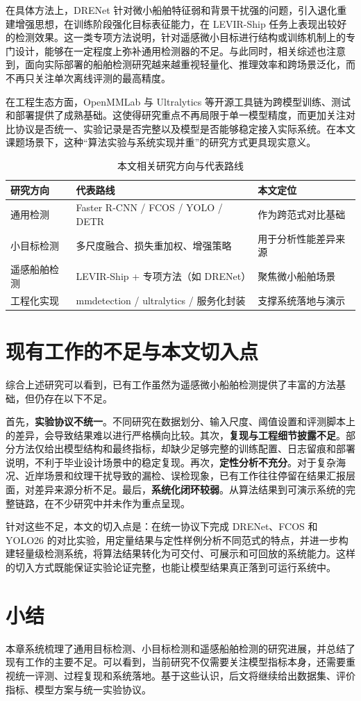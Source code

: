 在具体方法上，DRENet 针对微小船舶特征弱和背景干扰强的问题，引入退化重建增强思想，在训练阶段强化目标表征能力，在 LEVIR-Ship 任务上表现出较好的检测效果\cite{chen2022_tinyship_drenet}。这一类专项方法说明，针对遥感微小目标进行结构或训练机制上的专门设计，能够在一定程度上弥补通用检测器的不足。与此同时，相关综述也注意到，面向实际部署的船舶检测研究越来越重视轻量化、推理效率和跨场景泛化，而不再只关注单次离线评测的最高精度\cite{zhao2024_shipsurvey}。

在工程生态方面，OpenMMLab 与 Ultralytics 等开源工具链为跨模型训练、测试和部署提供了成熟基础\cite{mmdet2018_openmmlab,ultralytics2024_docs}。这使得研究重点不再局限于单一模型精度，而更加关注对比协议是否统一、实验记录是否完整以及模型是否能够稳定接入实际系统。在本文课题场景下，这种“算法实验与系统实现并重”的研究方式更具现实意义。

\begin{table}[htbp]
  \centering
  \caption{本文相关研究方向与代表路线}
  \label{tab:ch2_research_map}
  \begin{tabular}{lll}
    \toprule
    研究方向 & 代表路线 & 本文定位 \\
    \midrule
    通用检测 & Faster R-CNN / FCOS / YOLO / DETR & 作为跨范式对比基础 \\
    小目标检测 & 多尺度融合、损失重加权、增强策略 & 用于分析性能差异来源 \\
    遥感船舶检测 & LEVIR-Ship + 专项方法（如 DRENet） & 聚焦微小船舶场景 \\
    工程化实现 & mmdetection / ultralytics / 服务化封装 & 支撑系统落地与演示 \\
    \bottomrule
  \end{tabular}
\end{table}

\section{现有工作的不足与本文切入点}

综合上述研究可以看到，已有工作虽然为遥感微小船舶检测提供了丰富的方法基础，但仍存在以下不足。

首先，\textbf{实验协议不统一}。不同研究在数据划分、输入尺度、阈值设置和评测脚本上的差异，会导致结果难以进行严格横向比较。其次，\textbf{复现与工程细节披露不足}。部分方法仅给出模型结构和最终指标，却缺少足够完整的训练配置、日志留痕和部署说明，不利于毕业设计场景中的稳定复现。再次，\textbf{定性分析不充分}。对于复杂海况、近岸场景和纹理干扰导致的漏检、误检现象，已有工作往往停留在结果汇报层面，对差异来源分析不足。最后，\textbf{系统化闭环较弱}。从算法结果到可演示系统的完整链路，在不少研究中并未作为重点呈现。

针对这些不足，本文的切入点是：在统一协议下完成 DRENet、FCOS 和 YOLO26 的对比实验，用定量结果与定性样例分析不同范式的特点，并进一步构建轻量级检测系统，将算法结果转化为可交付、可展示和可回放的系统能力。这样的切入方式既能保证实验论证完整，也能让模型结果真正落到可运行系统中。

\section{小结}

本章系统梳理了通用目标检测、小目标检测和遥感船舶检测的研究进展，并总结了现有工作的主要不足。可以看到，当前研究不仅需要关注模型指标本身，还需要重视统一评测、过程复现和系统落地。基于这些认识，后文将继续给出数据集、评价指标、模型方案与统一实验协议。
